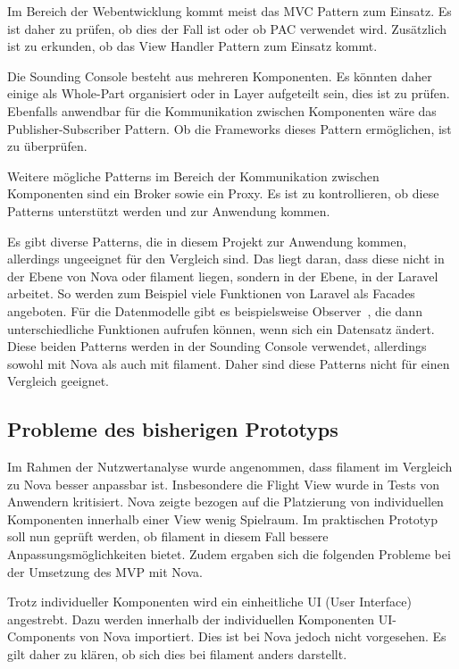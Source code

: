 \newpage

Im Bereich der Webentwicklung kommt meist das MVC Pattern zum Einsatz.
Es ist daher zu prüfen, ob dies der Fall ist oder ob PAC verwendet wird.
Zusätzlich ist zu erkunden, ob das View Handler Pattern zum Einsatz kommt.

Die Sounding Console besteht aus mehreren Komponenten.
Es könnten daher einige als Whole-Part organisiert oder in Layer aufgeteilt sein, dies ist zu prüfen.
Ebenfalls anwendbar für die Kommunikation zwischen Komponenten wäre das Publisher-Subscriber Pattern.
Ob die Frameworks dieses Pattern ermöglichen, ist zu überprüfen.

Weitere mögliche Patterns im Bereich der Kommunikation zwischen Komponenten sind ein Broker sowie ein Proxy.
Es ist zu kontrollieren, ob diese Patterns unterstützt werden und zur Anwendung kommen.

Es gibt diverse Patterns, die in diesem Projekt zur Anwendung kommen, allerdings ungeeignet für den Vergleich sind.
Das liegt daran, dass diese nicht in der Ebene von Nova oder filament liegen, sondern in der Ebene, in der Laravel arbeitet.
So werden zum Beispiel viele Funktionen von Laravel als Facades~\cite{gamma-design-patterns} angeboten.
Für die Datenmodelle gibt es beispielsweise Observer~\cite{gamma-design-patterns}, die dann unterschiedliche Funktionen aufrufen können, wenn sich ein Datensatz ändert.
Diese beiden Patterns werden in der Sounding Console verwendet, allerdings sowohl mit Nova als auch mit filament.
Daher sind diese Patterns nicht für einen Vergleich geeignet.

\newpage

\subsection{Probleme des bisherigen Prototyps}
Im Rahmen der Nutzwertanalyse wurde angenommen, dass filament im Vergleich zu Nova besser anpassbar ist.
Insbesondere die Flight View wurde in Tests von Anwendern kritisiert.
Nova zeigte bezogen auf die Platzierung von individuellen Komponenten innerhalb einer View wenig Spielraum.
Im praktischen Prototyp soll nun geprüft werden, ob filament in diesem Fall bessere Anpassungsmöglichkeiten bietet.
Zudem ergaben sich die folgenden Probleme bei der Umsetzung des MVP mit Nova.

Trotz individueller Komponenten wird ein einheitliche UI (User Interface) angestrebt.
Dazu werden innerhalb der individuellen Komponenten UI-Components von Nova importiert.
Dies ist bei Nova jedoch nicht vorgesehen.
Es gilt daher zu klären, ob sich dies bei filament anders darstellt.

